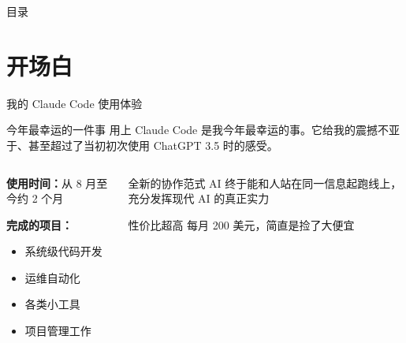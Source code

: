 \documentclass[aspectratio=169,xcolor=dvipsnames]{beamer}
\begin{document}
\begin{frame}[plain]
  \titlepage
\end{frame}

\begin{frame}[plain]{目录}
  \tableofcontents
\end{frame}

\section{开场白}

\begin{frame}{我的 Claude Code 使用体验}
  \begin{block}{今年最幸运的一件事}
    用上 Claude Code 是我今年最幸运的事。它给我的震撼不亚于、甚至超过了当初初次使用 ChatGPT 3.5 时的感受。
  \end{block}

  \vspace{0.3cm}

  \begin{columns}
    \begin{column}{0.48\textwidth}
      \textbf{使用时间：}从 8 月至今约 2 个月

      \vspace{0.3cm}

      \textbf{完成的项目：}
      \begin{itemize}
        \item 系统级代码开发
        \item 运维自动化
        \item 各类小工具
        \item 项目管理工作
      \end{itemize}
    \end{column}
    \begin{column}{0.48\textwidth}
      \begin{exampleblock}{全新的协作范式}
        AI 终于能和人站在同一信息起跑线上，充分发挥现代 AI 的真正实力
      \end{exampleblock}

      \vspace{0.3cm}

      \begin{alertblock}{性价比超高}
        每月 200 美元，简直是捡了大便宜
      \end{alertblock}
    \end{column}
  \end{columns}
\end{frame}
\end{document}
